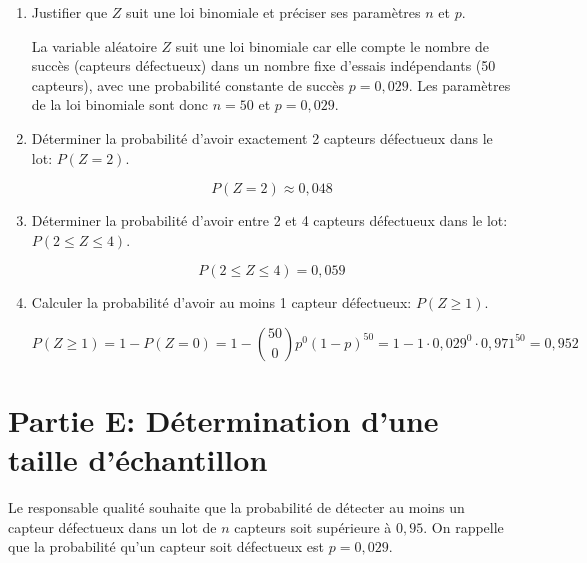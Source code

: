 \documentclass[11pt, a4paper]{report}
\begin{document}
\begin{enumerate}[resume]
    \item Justifier que $Z$ suit une loi binomiale et préciser ses paramètres $n$ et $p$.
    \begin{blocvisible}[height=4]
        La variable aléatoire $Z$ suit une loi binomiale car elle compte le nombre de succès (capteurs défectueux) dans un nombre fixe d'essais indépendants (50 capteurs), avec une probabilité constante de succès $p = 0,029$. Les paramètres de la loi binomiale sont donc $n = 50$ et $p = 0,029$.
    \end{blocvisible}

        \medskip

    \item Déterminer la probabilité d'avoir exactement 2 capteurs défectueux dans le lot: $P(Z = 2)$.
    \begin{blocvisible}[height=1]
\[P(Z = 2)  \approx 0,048\]
    \end{blocvisible}
    \medskip

    \item Déterminer la probabilité d'avoir entre 2 et 4 capteurs défectueux dans le lot: $P(2 \leq Z \leq 4)$.
    \begin{blocvisible}[height=1]
\[P(2 \leq Z \leq 4) = 0,059\]
    \end{blocvisible}
        \medskip
\item Calculer la probabilité d'avoir au moins 1 capteur défectueux: $P(Z \geq 1)$.
    \begin{blocvisible}[height=1.5]
\[P(Z \geq 1) = 1 - P(Z = 0) = 1 - \binom{50}{0} p^0 {(1-p)}^{50} = 1 - 1 \cdot 0,029^0 \cdot 0,971^{50} = 0,952\]
    \end{blocvisible}
    
\end{enumerate}

\section*{Partie E\@: Détermination d'une taille d'échantillon}

Le responsable qualité souhaite que la probabilité de détecter au moins un capteur défectueux dans un lot de $n$ capteurs soit supérieure à $0,95$. On rappelle que la probabilité qu'un capteur soit défectueux est $p = 0,029$.
\end{document}
